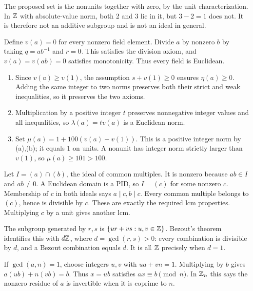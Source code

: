 The proposed set is the nonunits together with zero, by the unit characterization. In $\mathbb{Z}$ with absolute-value norm, both 2 and 3 lie in it, but $3-2=1$ does not. It is therefore not an additive subgroup and is not an ideal in general.

Define $v(a)=0$ for every nonzero field element. Divide $a$ by nonzero $b$ by taking $q=ab^{-1}$ and $r=0$. This satisfies the division axiom, and $v(a)=v(ab)=0$ satisfies monotonicity. Thus every field is Euclidean.

\begin{enumerate}[label=(\alph*)]
\item Since $v(a)\ge v(1)$, the assumption $s+v(1)\ge0$ ensures $\eta(a)\ge0$. Adding the same integer to two norms preserves both their strict and weak inequalities, so it preserves the two axioms.
\item Multiplication by a positive integer $t$ preserves nonnegative integer values and all inequalities, so $\lambda(a)=t v(a)$ is a Euclidean norm.
\item Set $\mu(a)=1+100(v(a)-v(1))$. This is a positive integer norm by (a),(b); it equals 1 on units. A nonunit has integer norm strictly larger than $v(1)$, so $\mu(a)\ge101>100$.
\end{enumerate}

Let $I=(a)\cap(b)$, the ideal of common multiples. It is nonzero because $ab\in I$ and $ab\ne0$. A Euclidean domain is a PID, so $I=(c)$ for some nonzero $c$. Membership of $c$ in both ideals says $a\mid c,b\mid c$. Every common multiple belongs to $(c)$, hence is divisible by $c$. These are exactly the required lcm properties. Multiplying $c$ by a unit gives another lcm.

The subgroup generated by $r,s$ is $\{ur+vs:u,v\in\mathbb{Z}\}$. Bezout's theorem identifies this with $d\mathbb{Z}$, where $d=\gcd(r,s)>0$: every combination is divisible by $d$, and a Bezout combination equals $d$. It is all $\mathbb{Z}$ precisely when $d=1$.

If $\gcd(a,n)=1$, choose integers $u,v$ with $ua+vn=1$. Multiplying by $b$ gives $a(ub)+n(vb)=b$. Thus $x=ub$ satisfies $ax\equiv b\pmod n$. In $\mathbb{Z}_n$ this says the nonzero residue of $a$ is invertible when it is coprime to $n$.

